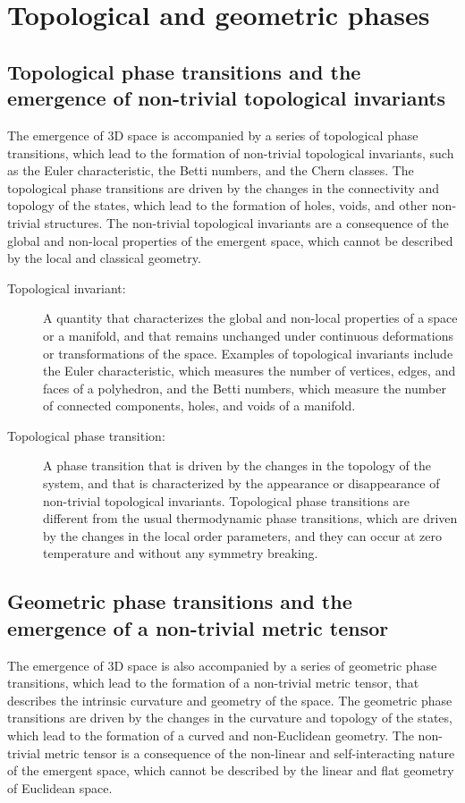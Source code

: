 \section{Topological and geometric phases}
\subsection{Topological phase transitions and the emergence of non-trivial topological invariants}
The emergence of 3D space is accompanied by a series of topological phase transitions, which lead to the formation of non-trivial topological invariants, such as the Euler characteristic, the Betti numbers, and the Chern classes. The topological phase transitions are driven by the changes in the connectivity and topology of the states, which lead to the formation of holes, voids, and other non-trivial structures. The non-trivial topological invariants are a consequence of the global and non-local properties of the emergent space, which cannot be described by the local and classical geometry.

\begin{tcolorbox}[colback=blue!5!white,colframe=blue!75!black,title=New terms]
    \begin{description}
        \item[Topological invariant:] A quantity that characterizes the global and non-local properties of a space or a manifold, and that remains unchanged under continuous deformations or transformations of the space. Examples of topological invariants include the Euler characteristic, which measures the number of vertices, edges, and faces of a polyhedron, and the Betti numbers, which measure the number of connected components, holes, and voids of a manifold.
        \item[Topological phase transition:] A phase transition that is driven by the changes in the topology of the system, and that is characterized by the appearance or disappearance of non-trivial topological invariants. Topological phase transitions are different from the usual thermodynamic phase transitions, which are driven by the changes in the local order parameters, and they can occur at zero temperature and without any symmetry breaking.
    \end{description}
\end{tcolorbox}

\subsection{Geometric phase transitions and the emergence of a non-trivial metric tensor}
The emergence of 3D space is also accompanied by a series of geometric phase transitions, which lead to the formation of a non-trivial metric tensor, that describes the intrinsic curvature and geometry of the space. The geometric phase transitions are driven by the changes in the curvature and topology of the states, which lead to the formation of a curved and non-Euclidean geometry. The non-trivial metric tensor is a consequence of the non-linear and self-interacting nature of the emergent space, which cannot be described by the linear and flat geometry of Euclidean space.

